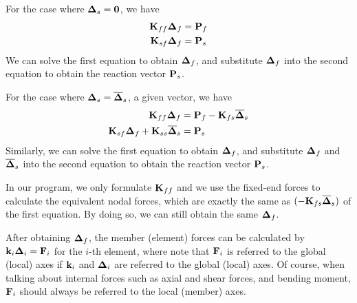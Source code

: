 For the case where $\bm{\Delta}_s = \mathbf{0}$, we have
\begin{align}
  \mathbf{K}_{ff}\bm{\Delta}_f &= \mathbf{P}_f\\
  \mathbf{K}_{sf}\bm{\Delta}_f &= \mathbf{P}_s
\end{align}
We can solve the first equation to obtain $\bm{\Delta}_f$, and substitute $\bm{\Delta}_f$ into the second equation to obtain the reaction vector $\mathbf{P}_s$.

For the case where $\bm{\Delta}_s = \overline{\bm{\Delta}}_s$, a given vector, we have
\begin{align}
  \mathbf{K}_{ff}\bm{\Delta}_f &= \mathbf{P}_f - \mathbf{K}_{fs}\overline{\bm{\Delta}}_s\\
  \mathbf{K}_{sf}\bm{\Delta}_f + \mathbf{K}_{ss}\overline{\bm{\Delta}}_s &= \mathbf{P}_s
\end{align}
Similarly, we can solve the first equation to obtain $\bm{\Delta}_f$, and substitute $\bm{\Delta}_f$ and $\overline{\bm{\Delta}}_s$ into the second equation to obtain the reaction vector $\mathbf{P}_s$.

In our program, we only formulate $\mathbf{K}_{ff}$ and we use the fixed-end forces to calculate the equivalent nodal forces, which are exactly the same as $(-\mathbf{K}_{fs}\overline{\bm{\Delta}}_s)$ of the first equation. By doing so, we can still obtain the same $\bm{\Delta}_f$.

After obtaining $\bm{\Delta}_f$, the member (element) forces can be calculated by $\mathbf{k}_i\bm{\Delta}_i = \mathbf{F}_i$ for the $i$-th element, where note that $\mathbf{F}_i$ is referred to the global (local) axes if $\mathbf{k}_i$ and $\bm{\Delta}_i$ are referred to the global (local) axes. Of course, when talking about internal forces such as axial and shear forces, and bending moment, $\mathbf{F}_i$ should always be referred to the local (member) axes.

